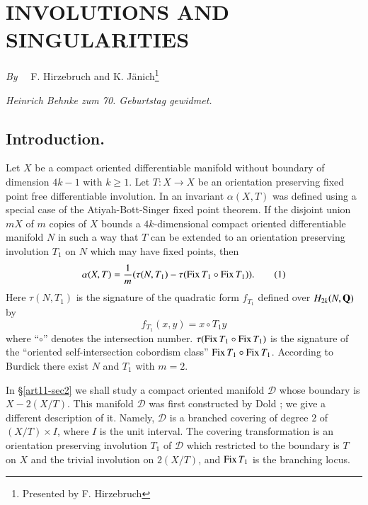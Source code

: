 \chapter[\textsc{F. Hirzebruch} and \textsc{K. J\"anich~:} Involutions and Singularities]{INVOLUTIONS AND SINGULARITIES}\label{art11}

\begin{center}
{\em By}~~ F. Hirzebruch and K. J\"anich\footnote{Presented by F. Hirzebruch}

\bigskip

{\em Heinrich Behnke zum {\rm 70.} Geburtstag gewidmet.}
\end{center}

\setcounter{pageoriginal}{218}
\section{Introduction.}\label{art11-sec1}\pageoriginale


Let $X$ be a compact oriented differentiable manifold without boundary of dimension $4k-1$ with $k\geq 1$. Let $T:X\to X$ be an orientation preserving fixed point free differentiable involution. In \cite{art11-key7} an invariant $\alpha(X,T)$ was defined using a special case of the Atiyah-Bott-Singer fixed point theorem. If the disjoint union $mX$ of $m$ copies of $X$ bounds a $4k$-dimensional compact oriented differentiable manifold $N$ in such a way that $T$ can be extended to an orientation preserving involution $T_{1}$ on $N$ which may have fixed points, then
\begin{equation*}
\alpha(X,T)=\dfrac{1}{m}(\tau(N,T_{1})- \tau(\operatorname{\mathrm{Fix}} T_{1}\circ \operatorname{\mathrm{Fix}} T_{1})).\tag{1}\label{art11-sec1-eq1}
\end{equation*}
Here $\tau(N,T_{1})$ is the signature of the quadratic form $f_{T_{1}}$ defined over $H_{2k}(N,\mathbf{Q})$ by
$$
f_{T_{1}}(x,y)=x\circ T_{1}y
$$
where ``$\circ$'' denotes the intersection number. $\tau(\operatorname{\mathrm{Fix}} T_{1}\circ \operatorname{\mathrm{Fix}} T_{1})$ is the signature of the ``oriented self-intersection cobordism class'' $\operatorname{\mathrm{Fix}} T_{1}\circ \operatorname{\mathrm{Fix}} T_{1}$. According to Burdick \cite{art11-key4} there exist $N$ and $T_{1}$ with $m=2$.

In \S\ref{art11-sec2} we shall study a compact oriented manifold $\mathscr{D}$ whose boundary is $X-2(X/T)$. This manifold $\mathscr{D}$ was first constructed by Dold \cite{art11-key5}; we give a different description of it. Namely, $\mathscr{D}$ is a branched covering of degree $2$ of $(X/T)\times I$, where $I$ is the unit interval. The covering transformation is an orientation preserving involution $T_{1}$ of $\mathscr{D}$ which restricted to the boundary is $T$ on $X$ and the trivial involution on $2(X/T)$, and $\operatorname{\mathrm{Fix}} T_{1}$ is the branching locus.

